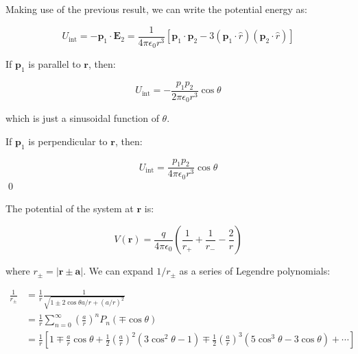 \documentclass[12pt]{article}
\begin{document}
Making use of the previous result, we can write the potential energy as:

\begin{equation}
    U_{\text{int}} = -\mathbf{p}_{1} \cdot \mathbf{E}_{2} = \frac{1}{4\pi\epsilon_{0}r^{3}} \left[ \mathbf{p}_{1} \cdot \mathbf{p}_{2} - 3(\mathbf{p}_{1} \cdot \hat{r})(\mathbf{p}_{2} \cdot \hat{r}) \right]
\end{equation}


If $\mathbf{p}_{1}$ is parallel to $\mathbf{r}$, then:

\begin{equation}
    U_{\text{int}} = -\frac{p_{1}p_{2}}{2\pi\epsilon_{0}r^{3}} \cos{\theta}
\end{equation}

which is just a sinusoidal function of $\theta$.

If $\mathbf{p}_{1}$ is perpendicular to $\mathbf{r}$, then:

\begin{equation}
    U_{\text{int}} = \frac{p_{1}p_{2}}{4\pi\epsilon_{0}r^{3}} \cos{\theta}
\end{equation}
\qed



The potential of the system at $\mathbf{r}$ is:

\begin{equation}
    V(\mathbf{r}) = \frac{q}{4\pi\epsilon_{0}} \left( \frac{1}{r_{+}} + \frac{1}{r_{-}} - \frac{2}{r} \right)
\end{equation}

where $r_{\pm} = \left\lvert \mathbf{r} \pm \mathbf{a} \right\rvert$. We can expand $1/r_{\pm}$ as a series of Legendre polynomials:

\begin{equation}
\begin{split}
    \frac{1}{r_{\pm}} &= \frac{1}{r} \frac{1}{\sqrt{1 \pm 2 \cos{\theta} a/r + \left( a/r \right)^{2}}} \\
    &= \frac{1}{r} \sum_{n=0}^{\infty} \left( \frac{a}{r} \right)^{n} P_{n}(\mp \cos{\theta}) \\
    &= \frac{1}{r} \left[ 1 \mp \frac{a}{r} \cos{\theta} + \frac{1}{2} \left( \frac{a}{r} \right)^{2} \left( 3 \cos^{2}{\theta} - 1 \right) \mp \frac{1}{2} \left( \frac{a}{r} \right)^{3} \left( 5 \cos^{3}{\theta} - 3 \cos{\theta} \right) + \cdots \right]
\end{split}
\end{equation}
\end{document}
